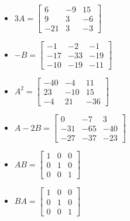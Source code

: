 \documentclass{ximera}
\begin{document}
\begin{enumerate}
\begin{multicols}{2}
\begin{itemize}
\item  $3A = \left[ \begin{array}{rrr} 6 & -9 & 15 \\ 9 & 3 &-6 \\ -21 & 3 & -3 \end{array} \right]$

\item $-B = \left[ \begin{array}{rrr} -1 & -2 & -1 \\ -17 & -33 & -19 \\ -10 & -19 & -11 \end{array} \right]$

\end{itemize}
\end{multicols}


\begin{multicols}{2}
\begin{itemize}

\item  $A^2 = \left[ \begin{array}{rrr} -40 & -4 & 11 \\ 23 & -10 & 15 \\ -4 & 21 & -36 \end{array} \right]$

\item $A-2B = \left[ \begin{array}{rrr} 0 & -7 & 3 \\ -31 & -65 & -40 \\ -27 & -37 & -23 \end{array} \right]$


\end{itemize}
\end{multicols}

\begin{multicols}{2}
\begin{itemize}

\item $AB =  \left[ \begin{array}{rrr} 1 & 0 & 0 \\ 0 & 1 & 0 \\ 0 & 0 & 1 \end{array} \right]$

\item $BA = \left[ \begin{array}{rrr} 1 & 0 & 0 \\ 0 & 1 & 0 \\ 0 & 0 & 1 \end{array} \right]$


\end{itemize}
\end{multicols}

	
\setcounter{HW}{\value{enumi}}
\end{enumerate}
\end{document}
